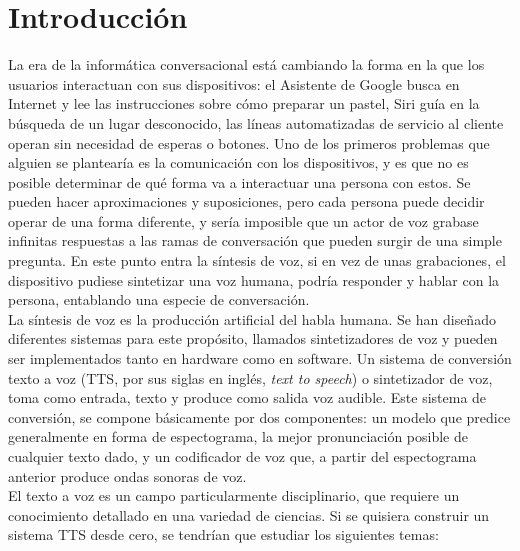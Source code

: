 \chapter*{Introducción}\label{chapter:introduction}

La era de la informática conversacional está cambiando la forma en la que los usuarios interactuan con sus dispositivos: el Asistente de Google busca en Internet y lee las instrucciones sobre cómo preparar un pastel, Siri guía en la búsqueda de un lugar desconocido, las líneas automatizadas de servicio al cliente operan sin necesidad de esperas o botones. Uno de los primeros problemas que alguien se plantearía es la comunicación con los dispositivos, y es que no es posible determinar de qué forma va a
interactuar una persona con estos. Se pueden hacer aproximaciones y suposiciones, pero cada persona puede decidir operar de una forma diferente, y sería imposible que un actor de voz grabase infinitas respuestas a las ramas de conversación que pueden surgir de una simple pregunta. En este punto entra la síntesis de voz, si en vez de unas grabaciones, el dispositivo pudiese sintetizar una voz humana, podría responder y hablar con la persona, entablando una especie de conversación.\\



La síntesis de voz es la producción artificial del habla humana. Se han diseñado diferentes sistemas para este propósito, llamados sintetizadores de voz y pueden ser implementados tanto en hardware como en software. Un sistema de conversión texto a voz (TTS, por sus siglas en inglés, \textit{text to speech}) o sintetizador de voz, toma como entrada, texto y produce como salida voz audible. Este sistema de conversión, se compone básicamente por dos componentes: un modelo que predice generalmente en forma de espectograma, la mejor pronunciación posible de cualquier texto dado, y un codificador de voz que, a partir del espectograma anterior produce ondas sonoras de voz.\\

El texto a voz es un campo particularmente disciplinario, que requiere un conocimiento
detallado en una variedad de ciencias. Si se quisiera construir un sistema TTS desde cero, se tendrían que estudiar los siguientes temas:

